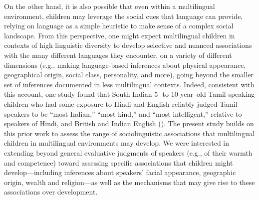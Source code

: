 \documentclass{foushee-adapted-preprint}
\begin{document}
On the other hand, it is also possible that even within a multilingual environment, children may leverage the social cues that language can provide, relying on language as a simple heuristic to make sense of a complex social landscape. From this perspective, one might expect multilingual children in contexts of high linguistic diversity to develop selective and nuanced associations with the many different languages they encounter, on a variety of different dimensions (e.g., making language-based inferences about physical appearance, geographical origin, social class, personality, and more), going beyond the smaller set of inferences documented in less multilingual contexts. Indeed, consistent with this account, one study found that South Indian 5- to 10-year--old Tamil-speaking children who had some exposure to Hindi and English reliably judged Tamil speakers to be ``most Indian,'' ``most kind,'' and ``most intelligent,'' relative to speakers of Hindi, and British and Indian English (\cite{santhanagopalan2021nationality}). %
The present study builds on this prior work to assess the range of sociolinguistic associations that multilingual children in multilingual environments may develop. We were interested in extending beyond general evaluative judgments of speakers (e.g., of their warmth and competence) toward assessing specific associations that children might develop---including inferences about speakers' facial appearance, geographic origin, wealth and religion---as well as the mechanisms that may give rise to these associations over development.
\end{document}
